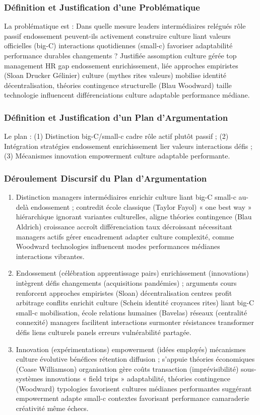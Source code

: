 \documentclass[11pt]{rapportECL}
\begin{document}
\subsubsection{Définition et Justification d’une Problématique}
La problématique est : Dans quelle mesure leaders intermédiaires relégués rôle passif endossement peuvent-ils activement construire culture liant valeurs officielles (big-C) interactions quotidiennes (small-c) favoriser adaptabilité performance durables changements ? Justifiée assomption culture gérée top management HR gap endossement enrichissement, liée approches empiristes (Sloan Drucker Gélinier) culture (mythes rites valeurs) mobilise identité décentralisation, théories contingence structurelle (Blau Woodward) taille technologie influencent différenciations culture adaptable performance médiane.

\subsubsection{Définition et Justification d’un Plan d’Argumentation}
Le plan : (1) Distinction big-C/small-c cadre rôle actif plutôt passif ; (2) Intégration stratégies endossement enrichissement lier valeurs interactions défis ; (3) Mécanismes innovation empowerment culture adaptable performante.

\subsubsection{Déroulement Discursif du Plan d’Argumentation}
\begin{enumerate}
\item Distinction managers intermédiaires enrichir culture liant big-C small-c au-delà endossement ; contredit école classique (Taylor Fayol) « one best way » hiérarchique ignorant variantes culturelles, aligne théories contingence (Blau Aldrich) croissance accroît différenciation taux décroissant nécessitant managers actifs gérer encadrement adapter culture complexité, comme Woodward technologies influencent modes performances médianes interactions vibrantes.
\item Endossement (célébration apprentissage pairs) enrichissement (innovations) intègrent défis changements (acquisitions pandémies) ; arguments cours renforcent approches empiristes (Sloan) décentralisation centres profit arbitrage conflits enrichit culture (Schein identité croyances rites) liant big-C small-c mobilisation, école relations humaines (Bavelas) réseaux (centralité connexité) managers facilitent interactions surmonter résistances transformer défis liens culturels panels erreurs vulnérabilité partagée.
\item Innovation (expérimentations) empowerment (idées employés) mécanismes culture évolutive bénéfices rétention diffusion ; s’appuie théories économiques (Coase Williamson) organisation gère coûts transaction (imprévisibilité) sous-systèmes innovations « field trips » adaptabilité, théories contingence (Woodward) typologies favorisent cultures médianes performantes suggérant empowerment adapte small-c contextes favorisant performance camaraderie créativité même échecs.
\end{enumerate}
\end{document}

